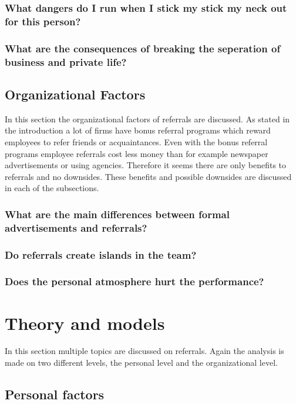\documentclass[a4paper, 11pt]{article} %
\begin{document}
\subsubsection*{What dangers do I run when I stick my stick my neck out for this person?}
\subsubsection*{What are the consequences of breaking the seperation of business and private life?}

\subsection*{Organizational Factors}

In this section the organizational factors of referrals are discussed. As stated in the introduction a lot of firms have bonus referral programs which reward employees to refer friends or acquaintances. Even with the bonus referral programs employee referrals cost less money than for example newspaper advertisements or using agencies. Therefore it seems there are only benefits to referrals and no downsides. These benefits and possible downsides are discussed in each of the subsections.

\subsubsection*{What are the main differences between formal advertisements and referrals?}
\subsubsection*{Do referrals create islands in the team?}
\subsubsection*{Does the personal atmosphere hurt the performance?}

\section*{Theory and models}
In this section multiple topics are discussed on referrals. Again the analysis is made on two different levels, the personal level and the organizational level. 

\subsection*{Personal factors}
\end{document}
